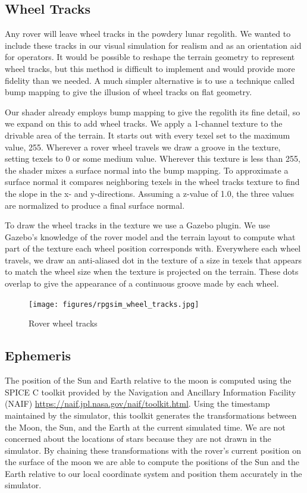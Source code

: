 \documentclass[twocolumn,letterpaper]{IEEEAerospaceCLS}  %
\begin{document}
\subsection{Wheel Tracks}
Any rover will leave wheel tracks in the powdery lunar regolith. We wanted to include these tracks in our visual simulation for realism and as an orientation aid for operators. 
It would be possible to reshape the terrain geometry to represent wheel tracks, but this method is difficult to implement and would provide more fidelity than we needed.
A much simpler alternative is to use a technique called bump mapping to give the illusion of wheel tracks on flat geometry.

Our shader already employs bump mapping to give the regolith its fine detail, so we expand on this to add wheel tracks. 
We apply a 1-channel texture to the drivable area of the terrain.
It starts out with every texel set to the maximum value, 255. 
Wherever a rover wheel travels we draw a groove in the texture, setting texels to 0 or some medium value.
Wherever this texture is less than 255, the shader mixes a surface normal into the bump mapping. 
To approximate a surface normal it compares neighboring texels in the wheel tracks texture to find the slope in the x- and y-directions. 
Assuming a z-value of 1.0, the three values are normalized to produce a final surface normal.

To draw the wheel tracks in the texture we use a Gazebo plugin. 
We use Gazebo's knowledge of the rover model and the terrain layout to compute what part of the texture each wheel position corresponds with. 
Everywhere each wheel travels, we draw an anti-aliased dot in the texture of a size in texels that appears to match the wheel size when the texture is projected on the terrain. 
These dots overlap to give the appearance of a continuous groove made by each wheel.
\begin{figure}[h!]
  \texttt{[image: figures/rpgsim\_wheel\_tracks.jpg]}
  \caption{Rover wheel tracks}
  \label{fig:wheeltracks}
\end{figure}

\subsection{Ephemeris}
The position of the Sun and Earth relative to the moon is computed using the SPICE C toolkit provided by the Navigation and Ancillary Information Facility (NAIF) \url{https://naif.jpl.nasa.gov/naif/toolkit.html}.  
Using the timestamp maintained by the simulator, this toolkit generates the transformations between the Moon, the Sun, and the Earth at the current simulated time.  
We are not concerned about the locations of stars because they are not drawn in the simulator.
By chaining these transformations with the rover's current position on the surface of the moon we are able to compute the positions of the Sun and the Earth relative to our local coordinate system and position them accurately in the simulator.  
\end{document}
